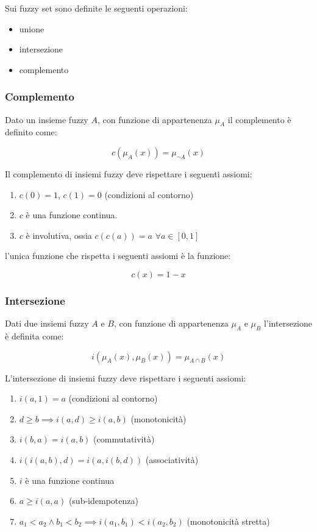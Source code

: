 Sui fuzzy set sono definite le seguenti operazioni:
\begin{itemize}
 \item unione
 \item intersezione
 \item complemento
\end{itemize}

\subsubsection{Complemento}

Dato un insieme fuzzy $A$, con funzione di appartenenza $\mu_A$ il complemento è definito come:

\begin{equation*}
 c(\mu_A(x)) = \mu_{\neg A}(x)
\end{equation*}

Il complemento di insiemi fuzzy deve rispettare i seguenti assiomi:
\begin{enumerate}
 \item $c(0)=1$, $c(1)=0$ (condizioni al contorno)
 \item $c$ è una funzione continua.
 \item $c$ è involutiva, ossia $c(c(a))=a\, \, \forall a \in [0, 1]$
\end{enumerate}

l'unica funzione che rispetta i seguenti assiomi è la funzione:

\begin{equation*}
 c(x) = 1 - x
\end{equation*}

\subsubsection{Intersezione}

Dati due insiemi fuzzy $A$ e $B$, con funzione di appartenenza $\mu_A$ e $\mu_B$ l'intersezione  è definita come:

\begin{equation*}
 i(\mu_A(x), \mu_B(x)) = \mu_{A\cap B}(x)
\end{equation*}

L'intersezione di insiemi fuzzy deve rispettare i seguenti assiomi:

\begin{enumerate}
 \item $i(a, 1)=a$ (condizioni al contorno)
 \item $d\geq b \implies  i(a,d)\geq i(a,b)$ (monotonicità)
 \item $i(b,a) = i(a,b)$ (commutatività)
 \item $i(i(a,b),d)=i(a,i(b,d))$ (associatività)
 \item $i$ è una funzione continua
 \item $a\geq i(a,a)$ (sub-idempotenza)
 \item $a_1<a_2 \wedge b_1<b_2\implies i(a_1,b_1)<i(a_2,b_2)$ (monotonicità stretta)
\end{enumerate}

